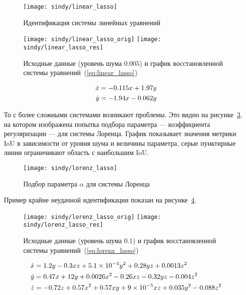 \begin{figure}
\texttt{[image: sindy/linear\_lasso]}
\caption{Идентификация системы линейных уравнений}
\label{fig:linear:lasso}
\end{figure}

\begin{figure}
\texttt{[image: sindy/linear\_lasso\_orig]}\hfill
\texttt{[image: sindy/linear\_lasso\_res]}
\caption{Исходные данные (уровень шума $0.005$) и график восстановленной системы уравнений~(\ref{eq:linear_lasso})}
\label{fig:linear:lasso_example}
\end{figure}

\begin{equation}
\normalspacing
\begin{aligned}
\dot{x} &= -0.115 x + 1.97 y \\
\dot{y} &= -1.94 x - 0.062 y
\end{aligned}
\label{eq:linear_lasso}
\end{equation}

То с более сложными системами возникают проблемы. Это видно на рисунке~\ref{fig:lorenz:lasso}, на котором изображена попытка подбора параметра --- коэффициента регуляризации --- для системы Лоренца. График показывает значения метрики IoU в зависимости от уровня шума и величины параметра, серые пунктирные линии ограничивают область с наибольшим IoU.

\begin{figure}
\texttt{[image: sindy/lorenz\_lasso]}
\caption{Подбор параметра $\alpha$ для системы Лоренца}
\label{fig:lorenz:lasso}
\end{figure}

Пример крайне неудачной идентификации показан на рисунке~\ref{fig:lorenz:lasso_example}.

\begin{figure}
\texttt{[image: sindy/lorenz\_lasso\_orig]}\hfill
\texttt{[image: sindy/lorenz\_lasso\_res]}
\caption{Исходные данные (уровень шума $0.1$) и график восстановленной системы уравнений~(\ref{eq:lorenz_lasso})}
\label{fig:lorenz:lasso_example}
\end{figure}

\begin{equation}
\normalspacing
\begin{aligned}
\dot{x} &= 1.2 y - 0.3 x z + \num{5.1e-4} y^2 + 0.28 y z + 0.0013 z^2 \\
\dot{y} &= 0.47 x + 12 y + 0.0026 x^2 - 0.26 x z - 0.32 y z - 0.004 z^2 \\
\dot{z} &= -0.72 z + 0.57 x^2 + 0.57 x y + \num{9e-5} x z + 0.035 y^2 - 0.088 z^2 \\
\end{aligned}
\label{eq:lorenz_lasso}
\end{equation}

